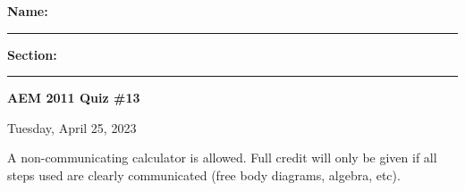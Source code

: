 \documentclass{article}
\begin{document}

\vspace{.5cm}
\noindent
\textbf{Name: }\rule{5cm}{0.4pt}\hspace{.5cm}
\textbf{Section: }\rule{1cm}{0.4pt}
\hfill\textbf{AEM 2011 Quiz \#13}

\noindent
\hfill Tuesday, April 25, 2023
\vspace{1cm}
\noindent

\vspace{.3cm}

\noindent A non-communicating calculator is allowed.  Full credit will only be given if all steps used are clearly communicated (free body diagrams, algebra, etc).

\vspace{0.5cm}













\end{document}
